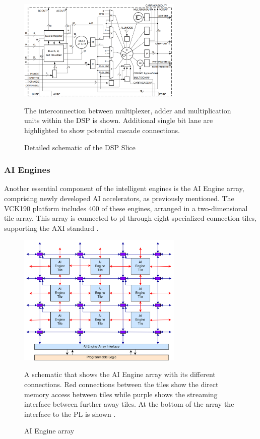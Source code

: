 \begin{figure}
    \centering
    \includegraphics[width=0.7\textwidth]{images/dsp_detail.png}
    \captionsetup{justification=centering}
    \caption{Detailed schematic of the DSP Slice \cite{AMD_a_aie}}
            The interconnection between multiplexer, adder and multiplication units within the DSP is shown. Additional single bit lane are highlighted to show potential cascade connections.
    \label{fig:dsp}
\end{figure}

\subsubsection{AI Engines}
Another essential component of the intelligent engines is the AI Engine array, comprising newly developed AI accelerators, as previously mentioned. The VCK190 platform includes 400 of these engines, arranged in a two-dimensional tile array. This array is connected to \ac{pl} through eight specialized connection tiles, supporting the AXI standard \cite{AMD_a_aie}.\par

\begin{figure}[h!]
    \centering
    \includegraphics[width=0.7\textwidth]{images/ai_array.png}
    \captionsetup{justification=centering}
    \caption{AI Engine array}
            A schematic that shows the AI Engine array with its different connections. Red connections between the tiles show the direct memory access between tiles while purple shows the streaming interface between further away tiles. At the bottom of the array the interface to the PL is shown \cite{AMD_a_aie}.
    \label{fig:ai_array}
\end{figure}

